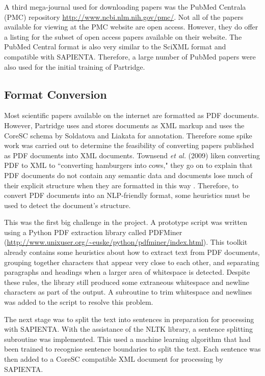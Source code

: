 A third mega-journal used for downloading papers was the PubMed Centrala (PMC)
repository \url{http://www.ncbi.nlm.nih.gov/pmc/}. Not all of
the papers available for viewing at the PMC website are open access. However,
they do offer a listing for the subset of open access papers available on their
website. The PubMed Central format is also very similar to the SciXML format
and compatible with SAPIENTA. Therefore, a large number of PubMed papers were
also used for the initial training of Partridge.

\subsection{Format Conversion} Most scientific papers available on the internet
are formatted as PDF documents. However, Partridge uses and stores documents as
XML markup and uses the CoreSC schema by Soldatova and
Liakata\cite{liakata2008guidelines} for annotation. Therefore some spike work
was carried out to determine the feasibility of converting papers published as
PDF documents into XML documents. Townsend \emph{et al.} (2009) liken
converting PDF to XML to ``converting hamburgers into cows," they go on to
explain that PDF documents do not contain any semantic data and documents lose
much of their explicit structure when they are formatted in this way
\cite{Townsend2009}.  Therefore, to convert PDF documents into an NLP-friendly
format, some heuristics must be used to detect the document's
structure\cite{pdfminer}.

This was the first big challenge in the project. A prototype script was written
using a Python PDF extraction library called PDFMiner
(\url{http://www.unixuser.org/~euske/python/pdfminer/index.html}).  This
toolkit already contains some heuristics about how to extract text from PDF
documents, grouping together characters that appear very close to each other,
and separating paragraphs and headings when a larger area of whitespace is
detected\cite{pdfminer}. Despite these rules, the library still produced some
extraneous whitespace and newline characters as part of the output. A
subroutine to trim whitespace and newlines was added to the script to resolve
this problem. 

The next stage was to split the text into sentences in preparation for
processing with SAPIENTA. With the assistance of the NLTK library, a sentence
splitting subroutine was implemented. This used a machine learning algorithm
that had been trained to recognise sentence boundaries to split the text. Each
sentence was then added to a CoreSC compatible XML document for processing by
SAPIENTA.

